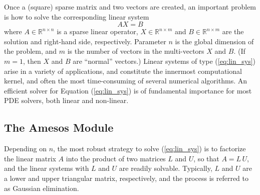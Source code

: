 \documentclass[10pt,relax]{SANDreport}
\begin{document}
Once a (square) sparse matrix and two vectors are created, an
important problem is how to solve the corresponding linear system
\begin{equation}
  \label{eq:lin_sys}
  A X = B
\end{equation}
where $A \in \mathbb{R}^{n \times n}$ is a sparse linear operator, $X
\in \mathbb{R}^{n \times m}$ and $B \in \mathbb{R}^{n \times m}$ are
the solution and right-hand side, respectively. Parameter $n$ is the
global dimension of the problem, and $m$ is the number of vectors in
the multi-vectors $X$ and $B$.  (If $m = 1$, then $X$ and $B$ are
``normal'' vectors.)  Linear systems of type (\ref{eq:lin_sys}) arise
in a variety of applications, and constitute the innermost
computational kernel, and often the most time-consuming of several
numerical algorithms. An efficient solver for Equation
(\ref{eq:lin_sys}) is of fundamental importance for most PDE solvers,
both linear and non-linear.

\subsection{The Amesos Module}
\label{subsec:amesos}

Depending on $n$, the most robust strategy to solve (\ref{eq:lin_sys})
is to factorize the linear matrix $A$ into the product of two matrices
$L$ and $U$, so that $A = L \, U$, and the linear systems with $L$ and
$U$ are readily solvable. Typically, $L$ and $U$ are a lower and upper
triangular matrix, respectively, and the process is referred to as
Gaussian elimination.
\end{document}
